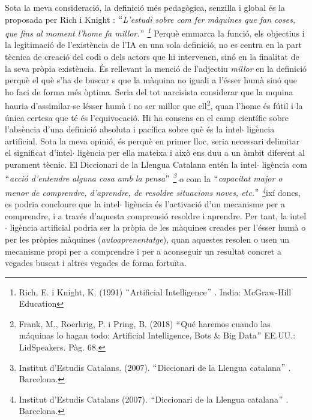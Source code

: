 \documentclass[12pt]{article}
\renewcommand{\_}{\kern-1.5pt\textunderscore\kern-1.5pt}
\begin{document}
\begin{itemize}
\vspace{\baselineskip}
\begin{justify}
Sota la meva consideració, la definició més pedagògica, senzilla i global és la proposada per Rich i Knight : $``$\textit{L’estudi sobre com fer màquines que fan coses, que fins al moment l’home fa millor.$"$ \footnote{ Rich, E. i Knight, K. (1991) $``$Artificial Intelligence$"$ . India: McGraw-Hill Education } }Perquè emmarca la funció, els objectius i la legitimació de l’existència de l’IA en una sola definició, no es centra en la part tècnica de creació del codi o dels actors que hi intervenen, sinó en la finalitat de la seva pròpia existència. És rellevant la menció de l’adjectiu \textit{millor }en la definició perquè el què s’ha de buscar s que la màquina no iguali a l’ésser humà sinó que ho faci de forma més òptima. Seria del tot narcisista considerar que la mquina hauria d’assimilar-se lésser humà i no ser millor que ell\footnote{ Frank, M., Roerhrig, P. i Pring, B. (2018) $``$Qué haremos cuando las máquinas lo hagan todo: Artificial Intelligence, Bots $\&$  Big Data$"$  EE.UU.: LidSpeakers. Pàg. 68.  }, quan l’home és fútil i la única certesa que té és l’equivocació.  Hi ha consens en el camp científic sobre l’absència d’una definició absoluta i pacífica sobre què és la intel$ \cdot $ ligència artificial. Sota la meva opinió, és perquè en primer lloc, seria necessari delimitar el significat d’intel$ \cdot $ ligència per ella mateixa i això ens duu a un àmbit diferent al purament tècnic. El Diccionari de la Llengua Catalana entén la intel$ \cdot $ ligència com $``$\textit{acció d’entendre alguna cosa amb la pensa$"$ \footnote{ Institut d’Estudis Catalans. (2007). $``$Diccionari de la Llengua catalana$"$ . Barcelona. } }o com la \textit{$``$capacitat major o menor de comprendre, d’aprendre, de resoldre situacions noves, etc.$"$ \footnote{ Institut d’Estudis Catalans (2007). $``$Diccionari de la Llengua catalana$"$ . Barcelona. }}ixí doncs, es podria concloure que la intel$ \cdot $ ligència és l’activació d’un mecanisme per a comprendre, i a través d’aquesta comprensió resoldre i aprendre. Per tant, la intel$ \cdot $ ligència artificial podria ser la pròpia de les màquines creades per l’ésser humà o per les pròpies màquines (\textit{autoaprenentatge}), quan aquestes resolen o usen un mecanisme propi per a comprendre i per a aconseguir un resultat concret a vegades buscat i altres vegades de forma fortuïta.
\end{justify}\par



\end{itemize}
\end{document}

